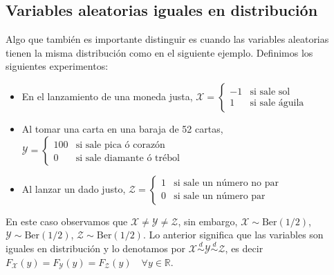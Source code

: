 \subsection{Variables aleatorias iguales en distribución}
Algo que también es importante distinguir es cuando las variables aleatorias tienen la misma distribución como en el siguiente ejemplo.
Definimos los siguientes experimentos:
\begin{itemize}
    \item En el lanzamiento de una moneda justa, $\mathcal X=\begin{cases}
        -1 & \text{si sale sol}\\
        1 & \text{si sale águila}
    \end{cases}$

    \item Al tomar una carta en una baraja de 52 cartas, $\mathcal Y=\begin{cases}
        100 & \text{si sale pica ó corazón}\\
        0 & \text{si sale diamante ó trébol}
    \end{cases}$

    \item Al lanzar un dado justo, $\mathcal Z=\begin{cases}
        1 & \text{si sale un número no par}\\
        0 & \text{si sale un número par}
    \end{cases}$
\end{itemize}
En este caso observamos que $\mathcal X \neq \mathcal Y \neq \mathcal Z$, sin embargo, $\mathcal X \sim \text{Ber}(1/2)$, $\mathcal Y \sim \text{Ber}(1/2)$, $\mathcal Z \sim \text{Ber}(1/2)$. Lo anterior significa que las variables son iguales en distribución y lo denotamos por $\mathcal X \stackrel{d}{\sim} \mathcal Y \stackrel{d}{\sim} \mathcal Z$, es decir $F_{\mathcal X}(y)=F_{\mathcal Y}(y)=F_{\mathcal Z}(y) \quad \forall y \in \mathbb{R}$.



